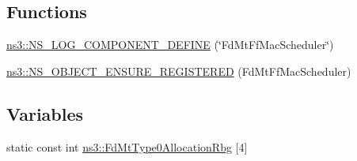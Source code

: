 \subsection*{Functions}
\begin{DoxyCompactItemize}
\item 
\hyperlink{namespacens3_a761020fed7d9cb9467099705f3c74139}{ns3\+::\+N\+S\+\_\+\+L\+O\+G\+\_\+\+C\+O\+M\+P\+O\+N\+E\+N\+T\+\_\+\+D\+E\+F\+I\+NE} (\char`\"{}Fd\+Mt\+Ff\+Mac\+Scheduler\char`\"{})
\item 
\hyperlink{namespacens3_a6ac688e48f7432177706339217e980b8}{ns3\+::\+N\+S\+\_\+\+O\+B\+J\+E\+C\+T\+\_\+\+E\+N\+S\+U\+R\+E\+\_\+\+R\+E\+G\+I\+S\+T\+E\+R\+ED} (Fd\+Mt\+Ff\+Mac\+Scheduler)
\end{DoxyCompactItemize}
\subsection*{Variables}
\begin{DoxyCompactItemize}
\item 
static const int \hyperlink{namespacens3_a8a964e0f59db1d8260efabeb77f6e46a}{ns3\+::\+Fd\+Mt\+Type0\+Allocation\+Rbg} \mbox{[}4\mbox{]}
\end{DoxyCompactItemize}
